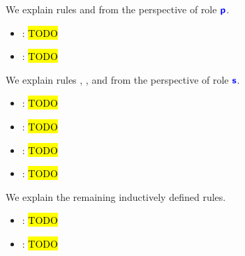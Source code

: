 \begin{figure}[!h]
\begin{prooftree}
\end{prooftree}

\begin{prooftree}
\end{prooftree}

\label{fig:newlocal}
\end{figure}

We explain rules  and 
from the perspective of role $\role{p}$.

\begin{itemize}

\item {}: 
\hl{TODO}

\item {}:
\hl{TODO}

\end{itemize}

We explain rules , ,
 and 
from the perspective of role $\role{s}$.

\begin{itemize}

\item {}:
\hl{TODO}

\item {}:
\hl{TODO}

\item {}:
\hl{TODO}

\item {}:
\hl{TODO}

\end{itemize}

We explain the remaining inductively defined rules.

\begin{itemize}

\item {}:
\hl{TODO}

\item {}:
\hl{TODO}

\end{itemize}
